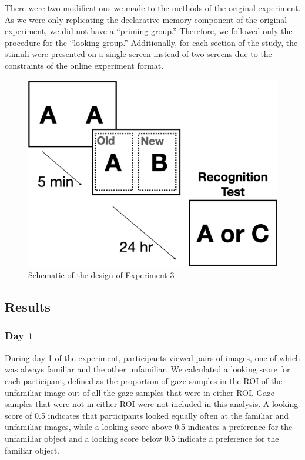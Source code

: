 \documentclass[
  man,floatsintext]{apa6}
\begin{document}
There were two modifications we made to the methods of the original
experiment. As we were only replicating the declarative memory component
of the original experiment, we did not have a ``priming group.''
Therefore, we followed only the procedure for the ``looking group.''
Additionally, for each section of the study, the stimuli were presented
on a single screen instead of two screens due to the constraints of the
online experiment format.

\begin{figure}
\centering
\includegraphics{group-c/E3-example-figure.jpeg}
\caption{\label{fig:E3-design-schematic}Schematic of the design of Experiment 3}
\end{figure}

\subsection{Results}\label{results-3}

\subsubsection{Day 1}\label{day-1}

During day 1 of the experiment, participants viewed pairs of images, one of which was always familiar and the other unfamiliar. We calculated a looking score for each participant, defined as the proportion of gaze samples in the ROI of the unfamiliar image out of all the gaze samples that were in either ROI. Gaze samples that were not in either ROI were not included in this analysis. A looking score of 0.5 indicates that participants looked equally often at the familiar and unfamiliar images, while a looking score above 0.5 indicates a preference for the unfamiliar object and a looking score below 0.5 indicate a preference for the familiar object.
\end{document}
